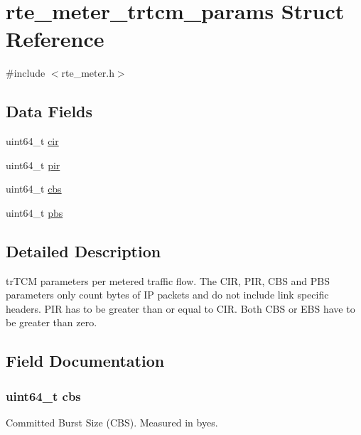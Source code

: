 \hypertarget{structrte__meter__trtcm__params}{}\section{rte\+\_\+meter\+\_\+trtcm\+\_\+params Struct Reference}
\label{structrte__meter__trtcm__params}


{\ttfamily \#include $<$rte\+\_\+meter.\+h$>$}

\subsection*{Data Fields}
\begin{DoxyCompactItemize}
\item 
uint64\+\_\+t \hyperlink{structrte__meter__trtcm__params_a882cbe4a787376c3a4d55bbf0b6e1f13}{cir}
\item 
uint64\+\_\+t \hyperlink{structrte__meter__trtcm__params_a2acc9a04d3a8ffeeb3b95f142ee15be7}{pir}
\item 
uint64\+\_\+t \hyperlink{structrte__meter__trtcm__params_ad914d97dc6b389901af9ddee395827de}{cbs}
\item 
uint64\+\_\+t \hyperlink{structrte__meter__trtcm__params_aac8f0f5688bed97bc62949c37308b13d}{pbs}
\end{DoxyCompactItemize}


\subsection{Detailed Description}
tr\+T\+C\+M parameters per metered traffic flow. The C\+I\+R, P\+I\+R, C\+B\+S and P\+B\+S parameters only count bytes of I\+P packets and do not include link specific headers. P\+I\+R has to be greater than or equal to C\+I\+R. Both C\+B\+S or E\+B\+S have to be greater than zero. 

\subsection{Field Documentation}
\hypertarget{structrte__meter__trtcm__params_ad914d97dc6b389901af9ddee395827de}{}
\subsubsection[{cbs}]{\setlength{\rightskip}{0pt plus 5cm}uint64\+\_\+t cbs}\label{structrte__meter__trtcm__params_ad914d97dc6b389901af9ddee395827de}
Committed Burst Size (C\+B\+S). Measured in byes. \hypertarget{structrte__meter__trtcm__params_a882cbe4a787376c3a4d55bbf0b6e1f13}{}
